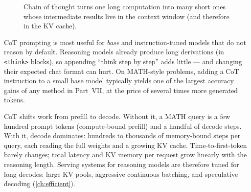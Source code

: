 \begin{figure}[t]
\centering
{}
\caption{Chain of thought turns one long computation into many short ones whose intermediate
results live in the context window (and therefore in the KV cache).}
\label{fig:scaling:cot}
\end{figure}

\begin{keyidea}
CoT prompting is most useful for \emph{base} and instruction-tuned models that do not reason by
default. Reasoning models already produce long derivations (in \texttt{<think>} blocks), so
appending ``think step by step'' adds little --- and changing their expected chat format can hurt.
On MATH-style problems, adding a CoT instruction to a small base model typically yields one of the
largest accuracy gains of any method in Part~VII, at the price of several times more generated
tokens.
\end{keyidea}

\begin{systemslens}
CoT shifts work from prefill to decode. Without it, a MATH query is a few hundred prompt tokens
(compute-bound prefill) and a handful of decode steps. With it, decode dominates: hundreds to
thousands of memory-bound steps per query, each reading the full weights and a growing KV cache.
Time-to-first-token barely changes; total latency and KV memory per request grow linearly with
the reasoning length. Serving systems for reasoning models are therefore tuned for long decodes:
large KV pools, aggressive continuous batching, and speculative decoding (\cref{ch:efficient}).
\end{systemslens}

